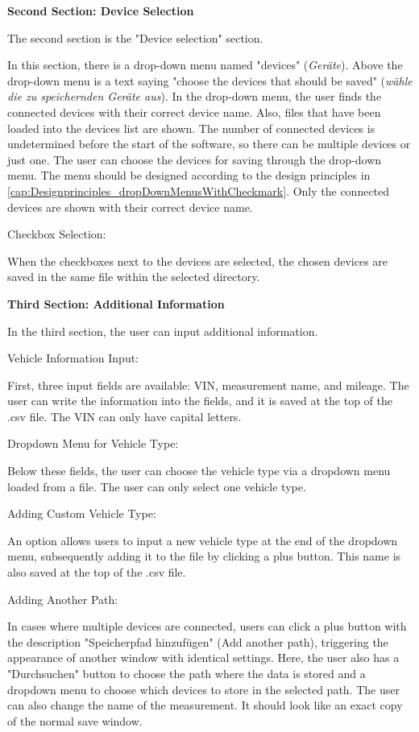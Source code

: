\documentclass[]{scrreprt}
\begin{document}
\textbf{Second Section: Device Selection}

The second section is the "Device selection" section.

In this section, there is a drop-down menu named "devices" (\textit{Geräte}). Above the drop-down menu is a text saying "choose the devices that should be saved" (\textit{wähle die zu speichernden Geräte aus}). In the drop-down menu, the user finds the connected devices with their correct device name. Also, files that have been loaded into the devices list are shown. The number of connected devices is undetermined before the start of the software, so there can be multiple devices or just one. The user can choose the devices for saving through the drop-down menu. The menu should be designed according to the design principles in \ref{cap:Designprinciples_dropDownMenusWithCheckmark}. Only the connected devices are shown with their correct device name.

Checkbox Selection:

When the checkboxes next to the devices are selected, the chosen devices are saved in the same file within the selected directory.

\textbf{Third Section: Additional Information}

In the third section, the user can input additional information.

Vehicle Information Input:

First, three input fields are available: VIN, measurement name, and mileage. The user can write the information into the fields, and it is saved at the top of the .csv file. The VIN can only have capital letters.

Dropdown Menu for Vehicle Type:

Below these fields, the user can choose the vehicle type via a dropdown menu loaded from a file. The user can only select one vehicle type.

Adding Custom Vehicle Type:

An option allows users to input a new vehicle type at the end of the dropdown menu, subsequently adding it to the file by clicking a plus button. This name is also saved at the top of the .csv file.

Adding Another Path:

In cases where multiple devices are connected, users can click a plus button with the description "Speicherpfad hinzufügen" (Add another path), triggering the appearance of another window with identical settings. Here, the user also has a "Durchsuchen" button to choose the path where the data is stored and a dropdown menu to choose which devices to store in the selected path. The user can also change the name of the measurement. It should look like an exact copy of the normal save window.
\end{document}
